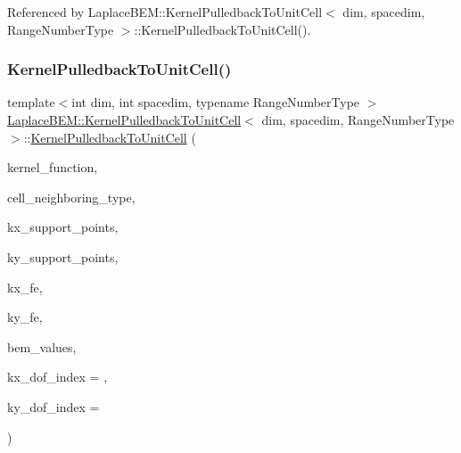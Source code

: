 Referenced by Laplace\+B\+E\+M\+::\+Kernel\+Pulledback\+To\+Unit\+Cell$<$ dim, spacedim, Range\+Number\+Type $>$\+::\+Kernel\+Pulledback\+To\+Unit\+Cell().

\mbox{\label{classLaplaceBEM_1_1KernelPulledbackToUnitCell_a3ef9d5f4401cc8d6bd7c11955fadb770}} 
\subsubsection{\texorpdfstring{Kernel\+Pulledback\+To\+Unit\+Cell()}{KernelPulledbackToUnitCell()}\hspace{0.1cm}{\footnotesize\ttfamily [2/3]}}
{\footnotesize\ttfamily template$<$int dim, int spacedim, typename Range\+Number\+Type $>$ \\
\hyperlink{classLaplaceBEM_1_1KernelPulledbackToUnitCell}{Laplace\+B\+E\+M\+::\+Kernel\+Pulledback\+To\+Unit\+Cell}$<$ dim, spacedim, Range\+Number\+Type $>$\+::\hyperlink{classLaplaceBEM_1_1KernelPulledbackToUnitCell}{Kernel\+Pulledback\+To\+Unit\+Cell} (\begin{DoxyParamCaption}\item[{const \hyperlink{classLaplaceBEM_1_1LaplaceKernel_1_1KernelFunction}{Laplace\+Kernel\+::\+Kernel\+Function}$<$ spacedim, Range\+Number\+Type $>$ \&}]{kernel\+\_\+function,  }\item[{const Cell\+Neighboring\+Type \&}]{cell\+\_\+neighboring\+\_\+type,  }\item[{const std\+::vector$<$ Point$<$ spacedim $>$$>$ \&}]{kx\+\_\+support\+\_\+points,  }\item[{const std\+::vector$<$ Point$<$ spacedim $>$$>$ \&}]{ky\+\_\+support\+\_\+points,  }\item[{const Finite\+Element$<$ dim, spacedim $>$ \&}]{kx\+\_\+fe,  }\item[{const Finite\+Element$<$ dim, spacedim $>$ \&}]{ky\+\_\+fe,  }\item[{const \hyperlink{classLaplaceBEM_1_1BEMValues}{B\+E\+M\+Values}$<$ dim, spacedim, Range\+Number\+Type $>$ $\ast$}]{bem\+\_\+values,  }\item[{const unsigned int}]{kx\+\_\+dof\+\_\+index = {},  }\item[{const unsigned int}]{ky\+\_\+dof\+\_\+index = {} }\end{DoxyParamCaption})}

